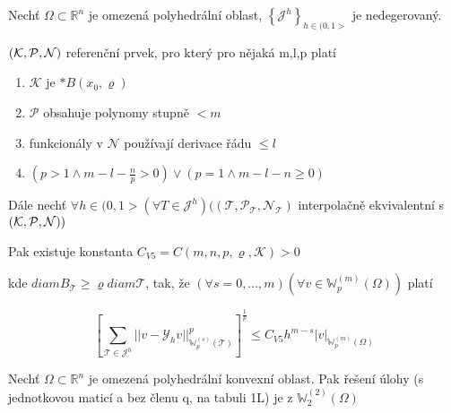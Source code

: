 \documentclass[../main.tex]{subfiles}
\begin{document}
\begin{theorem}[V5]
    Nechť $\Omega\subset\mathbb{R}^n$ je omezená polyhedrální oblast, $\left\{ \mathcal{J}^h \right\}_{h\in(0,1>}$ je nedegerovaný.

    $(\mathcal{K}, \mathcal{P}, \mathcal{N})$ referenční prvek, pro který pro nějaká m,l,p platí
    \begin{enumerate}
        \item $\mathcal{K}$ je $*B(x_0,\varrho)$
        \item $\mathcal{P}$ obsahuje polynomy stupně $< m$
        \item funkcionály v $\mathcal{N}$ používají derivace řádu $\leq l$
        \item $(p>1 \wedge m-l-\frac{n}{p} >0) \vee (p=1 \wedge m-l-n \geq 0)$
    \end{enumerate}

    Dále nechť $\forall h \in (0,1> (\forall T \in \mathcal{J}^h ) ( (\mathcal{T}, \mathcal{P}_\mathcal{T}, \mathcal{N}_\mathcal{T})$ interpolačně ekvivalentní s $(\mathcal{K}, \mathcal{P}, \mathcal{N}) )$

    Pak existuje konstanta $C_{V5} = C(m,n,p,\varrho,\mathcal{K}) > 0$

    kde $diam B_\mathcal{T} \geq \varrho diam \mathcal{T}$, tak, že $(\forall s = 0,...,m) (\forall v \in \mathbb{W}_p^{(m)}(\Omega))$ platí

    \begin{equation*}
        \left[  \sum_{\mathcal{T} \in \mathcal{J}^h} ||v - \mathcal{Y}_h v ||^p_{\mathbb{W}_p^{(s)}( \mathcal{T})}   \right]^\frac{1}{p}   \leq C_{V5} h^{m-s} |v|_{\mathbb{W}_p^{(m)} (\Omega) }
    \end{equation*}

\end{theorem}


\begin{claim}
    Nechť $\Omega\subset\mathbb{R}^n$ je omezená polyhedrální konvexní oblast. Pak řešení úlohy (s jednotkovou maticí a bez členu q, na tabuli 1L) je z $\mathbb{W}_2^{(2)}(\Omega)$

\end{claim}
\end{document}
